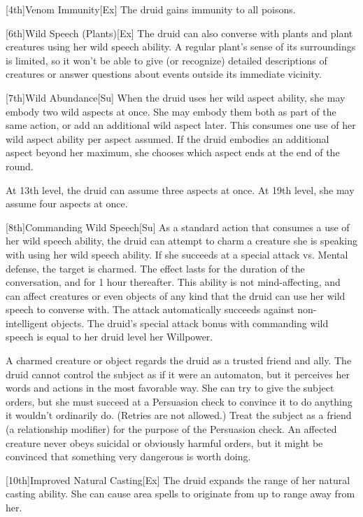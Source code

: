 [4th]{Venom Immunity}[Ex]
The druid gains immunity to all poisons.

[6th]{Wild Speech (Plants)}[Ex]
The druid can also converse with plants and plant creatures using her wild speech ability.
A regular plant's sense of its surroundings is limited, so it won't be able to give (or recognize) detailed descriptions of creatures or answer questions about events outside its immediate vicinity.

[7th]{Wild Abundance}[Su]
When the druid uses her wild aspect ability, she may embody two wild aspects at once.
She may embody them both as part of the same action, or add an additional wild aspect later.
This consumes one use of her wild aspect ability per aspect assumed.
If the druid embodies an additional aspect beyond her maximum, she chooses which aspect ends at the end of the round.

At 13th level, the druid can assume three aspects at once. At 19th level, she may assume four aspects at once.

[8th]{Commanding Wild Speech}[Su]
As a standard action that consumes a use of her wild speech ability, the druid can attempt to charm a creature she is speaking with using her wild speech ability.
If she succeeds at a special attack vs. Mental defense, the target is charmed.
The effect lasts for the duration of the conversation, and for 1 hour thereafter.
This ability is not mind-affecting, and can affect creatures or even objects of any kind that the druid can use her wild speech to converse with.
The attack automatically succeeds against non-intelligent objects.
The druid's special attack bonus with commanding wild speech is equal to her druid level \add her Willpower.

A charmed creature or object regards the druid as a trusted friend and ally.
The druid cannot control the subject as if it were an automaton, but it perceives her words and actions in the most favorable way.
She can try to give the subject orders, but she must succeed at a Persuasion check to convince it to do anything it wouldn't ordinarily do.
(Retries are not allowed.) Treat the subject as a friend (a  relationship modifier) for the purpose of the Persuasion check.
An affected creature never obeys suicidal or obviously harmful orders, but it might be convinced that something very dangerous is worth doing.

[10th]{Improved Natural Casting}[Ex]
The druid expands the range of her natural casting ability.
She can cause area spells to originate from up to \rngclose range away from her.

